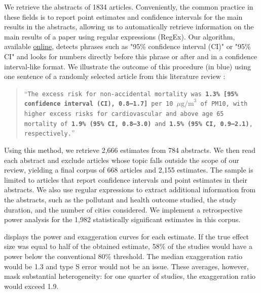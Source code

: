 \documentclass[12pt]{article}
\begin{document}
       We retrieve the abstracts of 1834 articles. Conveniently, the common practice in these fields is to report point estimates and confidence intervals for the main results in the abstracts, allowing us to automatically retrieve information on the main results of a paper using regular expressions (RegEx). Our algorithm, available \href{https://vincentbagilet.github.io/inference_pollution/automatic_lit_review_getting_abstracts.html}{online}, detects phrases such as "95\% confidence interval (CI)" or "95\% CI" and looks for numbers directly before this phrase or after and in a confidence interval-like format. We illustrate the outcome of this procedure (in blue) using one sentence of a randomly selected article from this literature review \citep{vichit-vadakan_public_2008}:
        
\begin{sloppypar}
        \begin{quote}
         \footnotesize    “\texttt{The excess risk for non-accidental mortality was \textbf{\color{cerulean}1.3\% [95\% confidence interval (CI), 0.8–1.7]} per 10 $\mu \text{g/m}^3$ of PM10, with higher excess risks for cardiovascular and above age 65 mortality of \textbf{\color{cerulean}1.9\% (95\% CI, 0.8–3.0)} and \textbf{\color{cerulean}1.5\% (95\% CI, 0.9–2.1)}, respectively.}”
        \end{quote}
\end{sloppypar}

        		Using this method, we retrieve 2,666 estimates from 784 abstracts. We then read each abstract and exclude articles whose topic falls outside the scope of our review, yielding a final corpus of 668 articles and 2,155 estimates. The sample is limited to articles that report confidence intervals and point estimates in their abstracts. We also use regular expressions to extract additional information from the abstracts, such as the pollutant and health outcome studied, the study duration, and the number of cities considered. We implement a retrospective power analysis for the 1,982 statistically significant estimates in this corpus. 
		
		 displays the power and exaggeration curves for each estimate. If the true effect size was equal to half of the obtained estimate, 58\% of the studies would have a power below the conventional 80\% threshold. The median exaggeration ratio would be 1.3 and type S error would not be an issue. These averages, however, mask substantial heterogeneity: for one quarter of studies, the exaggeration ratio would exceed 1.9.
\end{document}
